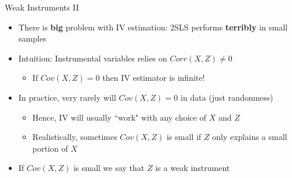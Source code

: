 \documentclass[aspectratio=169,11pt]{beamer}
\begin{document}
\begin{frame}{Weak Instruments II}
\begin{itemize}
\item There is \textbf{big} problem with IV estimation: 2SLS performs \textbf{terribly} in small samples
\medskip
	\item Intuition: Instrumental variables relies on $Corr(X,Z)\ne 0$
		\begin{itemize}
			\item If $Cov(X,Z)=0$ then IV estimator is infinite!
		\end{itemize}
\medskip
	\item In practice, very rarely will $Cov(X,Z)=0$ in data (just randomness)
		\begin{itemize}
			\item Hence, IV will usually ``work" with any choice of $X$ and $Z$
			\item Realistically, sometimes  $Cov(X,Z)$ is small if $Z$ only explains a small portion of $X$
		\end{itemize}
\medskip
	\item If $Cov(X,Z)$ is small we say that $Z$ is a weak instrument

\end{itemize}
\end{frame}
\end{document}
